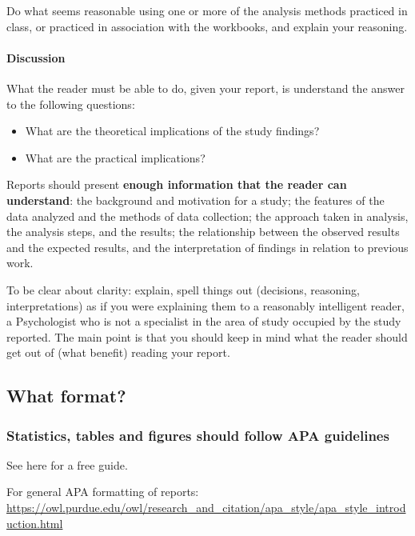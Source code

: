 \documentclass[
  letterpaper,
  DIV=11,
  numbers=noendperiod]{scrreprt}
\let\oldparagraph\paragraph
\renewcommand{\paragraph}[1]{\oldparagraph{#1}\mbox{}}
\providecommand{\tightlist}{%
  \setlength{\itemsep}{0pt}\setlength{\parskip}{0pt}}\usepackage{longtable,booktabs,array}
\begin{document}
Do what seems reasonable using one or more of the analysis methods
practiced in class, or practiced in association with the workbooks, and
explain your reasoning.

\hypertarget{sec-what-content-discussion}{%
\paragraph{Discussion}\label{sec-what-content-discussion}}

What the reader must be able to do, given your report, is understand the
answer to the following questions:

\begin{itemize}
\tightlist
\item
  What are the theoretical implications of the study findings?
\item
  What are the practical implications?
\end{itemize}

Reports should present \textbf{enough information that the reader can
understand}: the background and motivation for a study; the features of
the data analyzed and the methods of data collection; the approach taken
in analysis, the analysis steps, and the results; the relationship
between the observed results and the expected results, and the
interpretation of findings in relation to previous work.

To be clear about clarity: explain, spell things out (decisions,
reasoning, interpretations) as if you were explaining them to a
reasonably intelligent reader, a Psychologist who is not a specialist in
the area of study occupied by the study reported. The main point is that
you should keep in mind what the reader should get out of (what benefit)
reading your report.

\hypertarget{sec-what-format}{%
\subsection{What format?}\label{sec-what-format}}

\hypertarget{sec-what-format-APA}{%
\subsubsection{Statistics, tables and figures should follow APA
guidelines}\label{sec-what-format-APA}}

See here for a free guide.

For general APA formatting of reports:
\url{https://owl.purdue.edu/owl/research_and_citation/apa_style/apa_style_introduction.html}
\end{document}
